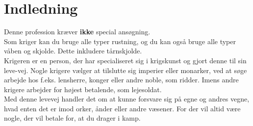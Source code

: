 
\chapter*{Indledning}

Denne profession kræver \textbf{ikke} special ansøgning.\\
Som kriger kan du bruge alle typer rustning, og du kan også bruge alle typer våben og skjolde. Dette inkludere tårnskjolde.\\

Krigeren er en person, der har specialiseret sig i krigskunst og gjort denne til sin leve-vej. Nogle krigere vælger at tilslutte sig imperier eller monarker, ved at søge arbejde hos f.eks. lensherre, konger eller andre noble, som ridder. Imens andre krigere arbejder for højest betalende, som lejesoldat.\\
Med denne levevej handler det om at kunne forsvare sig på egne og andres vegne, hvad enten det er imod orker, ånder eller andre væsener. For der vil altid være nogle, der vil betale for, at du drager i kamp.\\
